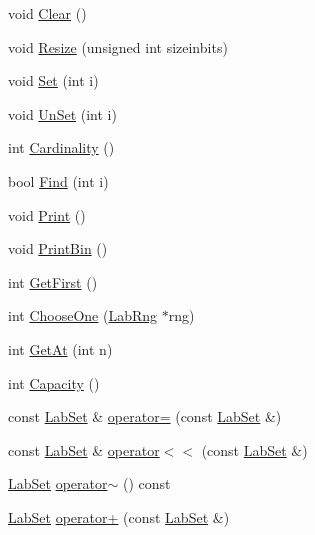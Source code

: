 \begin{DoxyCompactItemize}
\item 
void \hyperlink{classelps_1_1_lab_set_a1af71e62cef5f0987dc3bbf311674498}{Clear} ()
\item 
void \hyperlink{classelps_1_1_lab_set_a53c4155431730f3ec0f2c3f8fc13d79b}{Resize} (unsigned int sizeinbits)
\item 
void \hyperlink{classelps_1_1_lab_set_a2d380e24b86faa98ee6403bdca3d1eec}{Set} (int i)
\item 
void \hyperlink{classelps_1_1_lab_set_a4b7425944804261ddcd2510c134ae9de}{Un\+Set} (int i)
\item 
int \hyperlink{classelps_1_1_lab_set_a3b6cf9d666ba422e1dbb886f76a0b3d8}{Cardinality} ()
\item 
bool \hyperlink{classelps_1_1_lab_set_a9f9f3dfda83a7c9b7ad8d563fa8fbf5c}{Find} (int i)
\item 
void \hyperlink{classelps_1_1_lab_set_a0d76e54d10a0e65c8dfe247c82d3d970}{Print} ()
\item 
void \hyperlink{classelps_1_1_lab_set_a58ba49d1ecabdd4306e542ebe5e08623}{Print\+Bin} ()
\item 
int \hyperlink{classelps_1_1_lab_set_a83f94771ac42565e0a7a1037ef17c58f}{Get\+First} ()
\item 
int \hyperlink{classelps_1_1_lab_set_a79b4dfa4250c0a3606260d37b92ef940}{Choose\+One} (\hyperlink{classelps_1_1_lab_rng}{Lab\+Rng} $\ast$rng)
\item 
int \hyperlink{classelps_1_1_lab_set_a8b2ea032f9f0ce6b3b93f2fa696f68df}{Get\+At} (int n)
\item 
int \hyperlink{classelps_1_1_lab_set_af6635dce72522f997bff7de97c5fd1d9}{Capacity} ()
\item 
const \hyperlink{classelps_1_1_lab_set}{Lab\+Set} \& \hyperlink{classelps_1_1_lab_set_ac9f7e17e5ae2fc0447e7a197fbb4963c}{operator=} (const \hyperlink{classelps_1_1_lab_set}{Lab\+Set} \&)
\item 
const \hyperlink{classelps_1_1_lab_set}{Lab\+Set} \& \hyperlink{classelps_1_1_lab_set_a5a65e7f9a2679bd8edb90f4f0a973c7a}{operator$<$$<$} (const \hyperlink{classelps_1_1_lab_set}{Lab\+Set} \&)
\item 
\hyperlink{classelps_1_1_lab_set}{Lab\+Set} \hyperlink{classelps_1_1_lab_set_ac7db0849fb96d99dded46eabaed78b58}{operator$\sim$} () const 
\item 
\hyperlink{classelps_1_1_lab_set}{Lab\+Set} \hyperlink{classelps_1_1_lab_set_a716122e991683aa7b79c8f2c8544f9f6}{operator+} (const \hyperlink{classelps_1_1_lab_set}{Lab\+Set} \&)
\item 

\end{DoxyCompactItemize}
